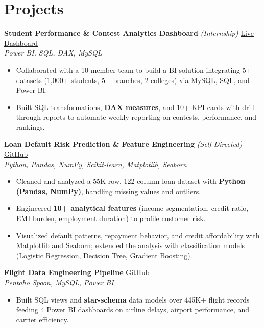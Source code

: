 \documentclass[a4paper,10pt]{article}
\begin{document}
\section{Projects}
\textbf{Student Performance \& Contest Analytics Dashboard} \textit{(Internship)} \hfill \href{https://app.powerbi.com/links/q7Z6OSaJ-t?ctid=0d11b6ec-52ac-4a84-9442-43048f433ac9&pbi_source=linkShare}{Live Dashboard} \\
\textit{Power BI, SQL, DAX, MySQL}
\begin{itemize}[nosep,after=\strut, leftmargin=1em, itemsep=1pt,label=--]
\item Collaborated with a 10-member team to build a BI solution integrating 5+ datasets (1,000+ students, 5+ branches, 2 colleges) via MySQL, SQL, and Power BI.
\item Built SQL transformations, \textbf{DAX measures}, and 10+ KPI cards with drill-through reports to automate weekly reporting on contests, performance, and rankings.
\end{itemize}
\vspace{2pt}
\textbf{Loan Default Risk Prediction \& Feature Engineering} \textit{(Self-Directed)} \hfill \href{https://github.com/Rider-04/bank-loan-default-risk-analysis}{GitHub} \\
\textit{Python, Pandas, NumPy, Scikit-learn, Matplotlib, Seaborn}
\begin{itemize}[nosep,after=\strut, leftmargin=1em, itemsep=1pt,label=--]
\item Cleaned and analyzed a 55K-row, 122-column loan dataset with \textbf{Python (Pandas, NumPy)}, handling missing values and outliers.
\item Engineered \textbf{10+ analytical features} (income segmentation, credit ratio, EMI burden, employment duration) to profile customer risk.
\item Visualized default patterns, repayment behavior, and credit affordability with Matplotlib and Seaborn; extended the analysis with classification models (Logistic Regression, Decision Tree, Gradient Boosting).
\end{itemize}
\vspace{2pt}
\textbf{Flight Data Engineering Pipeline} \hfill \href{https://github.com/Rider-04/flight-data-engineering-pipeline.git}{GitHub} \\
\textit{Pentaho Spoon, MySQL, Power BI}
\begin{itemize}[nosep,after=\strut, leftmargin=1em, itemsep=1pt,label=--]
\item Built SQL views and \textbf{star-schema} data models over 445K+ flight records feeding 4 Power BI dashboards on airline delays, airport performance, and carrier efficiency.
\end{itemize}
\vspace{2pt}
\end{document}
